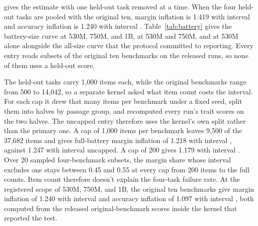  gives the estimate with one held-out task removed at a time. When the four held-out tasks are pooled with the original ten, margin inflation is 1.419 with interval  and accuracy inflation is 1.240 with interval . Table~\ref{tab:battery} gives the battery-size curve at 530M, 750M, and 1B, at 530M and 750M, and at 530M alone alongside the all-size curve that the protocol committed to reporting. Every entry reads subsets of the original ten benchmarks on the released runs, so none of them uses a held-out score.

The held-out tasks carry 1,000 items each, while the original benchmarks range from 500 to 14,042, so a separate kernel asked what item count costs the interval. For each cap it drew that many items per benchmark under a fixed seed, split them into halves by passage group, and recomputed every run's trait scores on the two halves. The uncapped entry therefore uses the kernel's own split rather than the primary one. A cap of 1,000 items per benchmark leaves 9,500 of the 37,682 items and gives full-battery margin inflation of 1.218 with interval , against 1.247 with interval  uncapped. A cap of 200 gives 1.179 with interval . Over 20 sampled four-benchmark subsets, the margin share whose interval excludes one stays between 0.45 and 0.55 at every cap from 200 items to the full counts. Item count therefore doesn't explain the four-task failure rate. At the registered scope of 530M, 750M, and 1B, the original ten benchmarks give margin inflation of 1.240 with interval  and accuracy inflation of 1.097 with interval , both computed from the released original-benchmark scores inside the kernel that reported the test.

